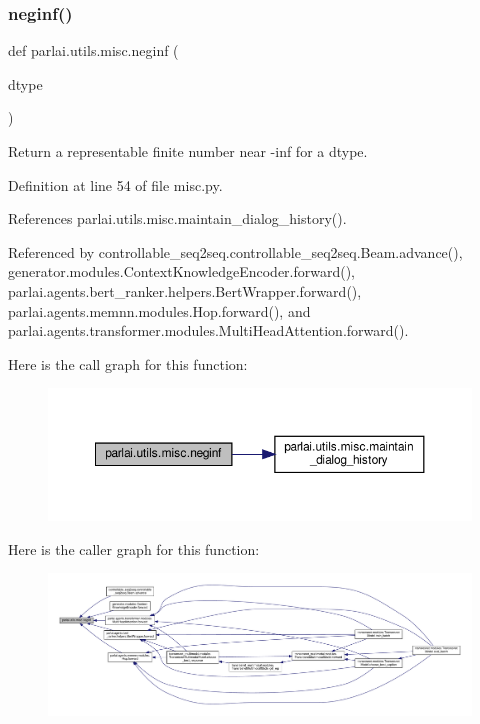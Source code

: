 \subsubsection{\texorpdfstring{neginf()}{neginf()}}
{\footnotesize\ttfamily def parlai.\+utils.\+misc.\+neginf (\begin{DoxyParamCaption}\item[{}]{dtype }\end{DoxyParamCaption})}

\begin{DoxyVerb}Return a representable finite number near -inf for a dtype.\end{DoxyVerb}
 

Definition at line 54 of file misc.\+py.



References parlai.\+utils.\+misc.\+maintain\+\_\+dialog\+\_\+history().



Referenced by controllable\+\_\+seq2seq.\+controllable\+\_\+seq2seq.\+Beam.\+advance(), generator.\+modules.\+Context\+Knowledge\+Encoder.\+forward(), parlai.\+agents.\+bert\+\_\+ranker.\+helpers.\+Bert\+Wrapper.\+forward(), parlai.\+agents.\+memnn.\+modules.\+Hop.\+forward(), and parlai.\+agents.\+transformer.\+modules.\+Multi\+Head\+Attention.\+forward().

Here is the call graph for this function\+:
\nopagebreak
\begin{figure}[H]
\begin{center}
\leavevmode
\includegraphics[width=350pt]{namespaceparlai_1_1utils_1_1misc_a68c44ca571de7149b683539db659c330_cgraph}
\end{center}
\end{figure}
Here is the caller graph for this function\+:
\nopagebreak
\begin{figure}[H]
\begin{center}
\leavevmode
\includegraphics[width=350pt]{namespaceparlai_1_1utils_1_1misc_a68c44ca571de7149b683539db659c330_icgraph}
\end{center}
\end{figure}
\mbox{\label{namespaceparlai_1_1utils_1_1misc_a38a23cfa0fc3dbed42846787d1c04b57}} 
